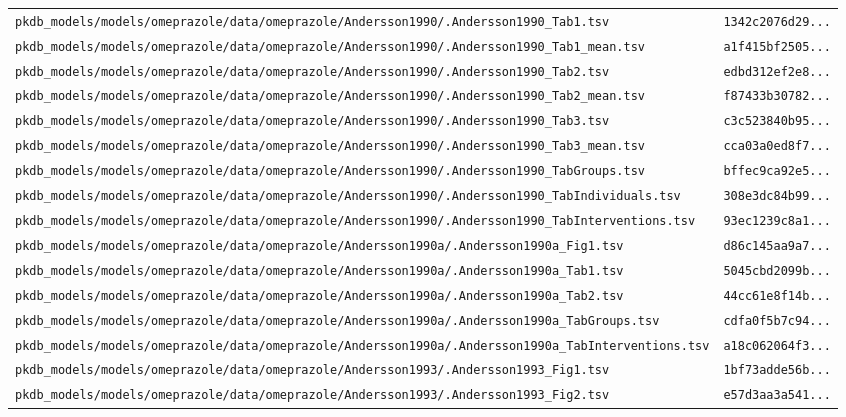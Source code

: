\documentclass{article}
\begin{document}
\begin{longtable}{ll}
\texttt{pkdb\_models/models/omeprazole/data/omeprazole/Andersson1990/.Andersson1990\_Tab1.tsv} & \texttt{1342c2076d29...} \\
\texttt{pkdb\_models/models/omeprazole/data/omeprazole/Andersson1990/.Andersson1990\_Tab1\_mean.tsv} & \texttt{a1f415bf2505...} \\
\texttt{pkdb\_models/models/omeprazole/data/omeprazole/Andersson1990/.Andersson1990\_Tab2.tsv} & \texttt{edbd312ef2e8...} \\
\texttt{pkdb\_models/models/omeprazole/data/omeprazole/Andersson1990/.Andersson1990\_Tab2\_mean.tsv} & \texttt{f87433b30782...} \\
\texttt{pkdb\_models/models/omeprazole/data/omeprazole/Andersson1990/.Andersson1990\_Tab3.tsv} & \texttt{c3c523840b95...} \\
\texttt{pkdb\_models/models/omeprazole/data/omeprazole/Andersson1990/.Andersson1990\_Tab3\_mean.tsv} & \texttt{cca03a0ed8f7...} \\
\texttt{pkdb\_models/models/omeprazole/data/omeprazole/Andersson1990/.Andersson1990\_TabGroups.tsv} & \texttt{bffec9ca92e5...} \\
\texttt{pkdb\_models/models/omeprazole/data/omeprazole/Andersson1990/.Andersson1990\_TabIndividuals.tsv} & \texttt{308e3dc84b99...} \\
\texttt{pkdb\_models/models/omeprazole/data/omeprazole/Andersson1990/.Andersson1990\_TabInterventions.tsv} & \texttt{93ec1239c8a1...} \\
\texttt{pkdb\_models/models/omeprazole/data/omeprazole/Andersson1990a/.Andersson1990a\_Fig1.tsv} & \texttt{d86c145aa9a7...} \\
\texttt{pkdb\_models/models/omeprazole/data/omeprazole/Andersson1990a/.Andersson1990a\_Tab1.tsv} & \texttt{5045cbd2099b...} \\
\texttt{pkdb\_models/models/omeprazole/data/omeprazole/Andersson1990a/.Andersson1990a\_Tab2.tsv} & \texttt{44cc61e8f14b...} \\
\texttt{pkdb\_models/models/omeprazole/data/omeprazole/Andersson1990a/.Andersson1990a\_TabGroups.tsv} & \texttt{cdfa0f5b7c94...} \\
\texttt{pkdb\_models/models/omeprazole/data/omeprazole/Andersson1990a/.Andersson1990a\_TabInterventions.tsv} & \texttt{a18c062064f3...} \\
\texttt{pkdb\_models/models/omeprazole/data/omeprazole/Andersson1993/.Andersson1993\_Fig1.tsv} & \texttt{1bf73adde56b...} \\
\texttt{pkdb\_models/models/omeprazole/data/omeprazole/Andersson1993/.Andersson1993\_Fig2.tsv} & \texttt{e57d3aa3a541...} \\

\end{longtable}
\end{document}
